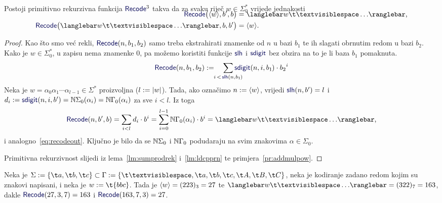\begin{lema}[{name=[primitivna rekurzivnost \emph{input\slash output} sustava trake]}]\label{lm:recodeprn}
Postoji primitivno rekurzivna funkcija $\f{Recode}^3$ takva da za svaku riječ $w\in\Sigma_0^*$ vrijede jednakosti
\begin{align}
\SwapAboveDisplaySkip
    \label{eq:recodein}\f{Recode}\bigl(\kr w,b',b\bigr)&=\knk{w\bl\ldots}\text,\\
    \label{eq:recodeout}\f{Recode}\bigl(\knk{w\bl\ldots},b,b'\bigr)&=\kr w\text.
\end{align}
\end{lema}
\begin{proof}
Kao što smo već rekli, $\f{Recode}(n,b_1,b_2)$ samo treba ekstrahirati znamenke od $n$ u bazi $b_1$ te ih slagati obrnutim redom u bazi $b_2$. Kako je $w\in\Sigma_0^*$, u zapisu nema znamenke $0$, pa
možemo koristiti funkcije $\f{slh}$ i $\f{sdigit}$ bez obzira na to je li baza $b_1$ pomaknuta.
\begin{equation}
	\f{Recode}(n,b_1,b_2):=\quad\sum_{\mathclap{i\,<\,\f{slh}(n,b_1\mspace{-1mu})}}\f{sdigit}(n,i,b_1\mspace{-1mu})\cdot{b_2}^i
\end{equation}
Neka je $w=\alpha_0\alpha_1\dotsm\alpha_{l-1}\in\Sigma^*$ proizvoljna ($l:=\lvert w\rvert$). Tada, ako označimo $n:=\langle w\rangle$, vrijedi $\f{slh}(n,b')=l$ i $d_i:=\f{sdigit}(n,i,b')=\N\Sigma_0(\alpha_i)=\N\Gamma_0(\alpha_i)$ za sve $i<l$. Iz toga
\begin{equation}
    \f{Recode}(n,b',b)=\sum_{i<l}d_i\cdot b^i=\sum_{i=0}^{l-1}\N\Gamma_0(\alpha_i)\cdot b^i=\knk{w\bl\ldots}\text,
\end{equation}
i analogno~\eqref{eq:recodeout}. Ključno je bilo da se ${\mathbb N}\Sigma_0$ i ${\mathbb N}\Gamma_0$ podudaraju na svim znakovima $\alpha\in\Sigma_0$.

    Primitivna rekurzivnost slijedi iz lema~\ref{lm:sumprodrek} i~\ref{lm:ldcpprn} te primjera~\ref{pr:addmulpow}.
\end{proof}

\begin{primjer}[{name=[korištenje \emph{input\slash output} sustava trake]}]
Neka je $\Sigma:=\{\t a,\t b,\t c\}\subset\Gamma:=\{\bl,\t a,\t b,\t c,\t A,\t B,\t C\}$, neka je kodiranje zadano redom kojim su znakovi napisani, i neka je $w:=\t{bbc}$. Tada je $\langle w\rangle=(223)_3=27$ te $\knk{w\bl\ldots}=(322)_7=163$, dakle $\f{Recode}(27,3,7)=163$ i $\f{Recode}(163,7,3)=27$.
\end{primjer}


